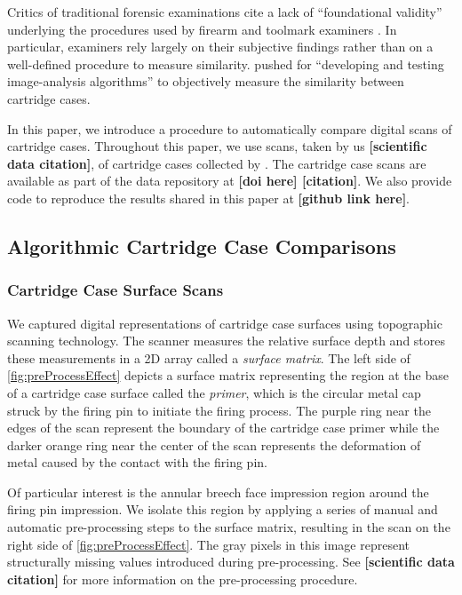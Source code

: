 \documentclass[reprint]{JASA}
\begin{document}
Critics of traditional forensic examinations cite a lack of
``foundational validity'' underlying the procedures used by firearm and
toolmark examiners \citep{council_strengthening_2009, pcast2016}. In
particular, examiners rely largely on their subjective findings rather
than on a well-defined procedure to measure similarity.
 pushed for ``developing and testing
image-analysis algorithms'' to objectively measure the similarity
between cartridge cases.

In this paper, we introduce a procedure to automatically compare digital
scans of cartridge cases. Throughout this paper, we use scans, taken by
us \textbf{{[}scientific data citation{]}}, of cartridge cases collected
by \citet{Baldwin2014}. The cartridge case scans are available as part
of the data repository at \textbf{{[}doi here{]} {[}citation{]}}. We
also provide code to reproduce the results shared in this paper at
\textbf{{[}github link here{]}}.

\hypertarget{algorithmic-cartridge-case-comparisons}{%
\subsection{Algorithmic Cartridge Case
Comparisons}\label{algorithmic-cartridge-case-comparisons}}

\hypertarget{cartridge-case-surface-scans}{%
\subsubsection{Cartridge Case Surface
Scans}\label{cartridge-case-surface-scans}}

We captured digital representations of cartridge case surfaces using
topographic scanning technology. The scanner measures the relative
surface depth and stores these measurements in a 2D array called a
\emph{surface matrix}. The left side of \autoref{fig:preProcessEffect}
depicts a surface matrix representing the region at the base of a
cartridge case surface called the \emph{primer}, which is the circular
metal cap struck by the firing pin to initiate the firing process. The
purple ring near the edges of the scan represent the boundary of the
cartridge case primer while the darker orange ring near the center of
the scan represents the deformation of metal caused by the contact with
the firing pin.

Of particular interest is the annular breech face impression region
around the firing pin impression. We isolate this region by applying a
series of manual and automatic pre-processing steps to the surface
matrix, resulting in the scan on the right side of
\autoref{fig:preProcessEffect}. The gray pixels in this image represent
structurally missing values introduced during pre-processing. See
\textbf{{[}scientific data citation{]}} for more information on the
pre-processing procedure.
\end{document}
